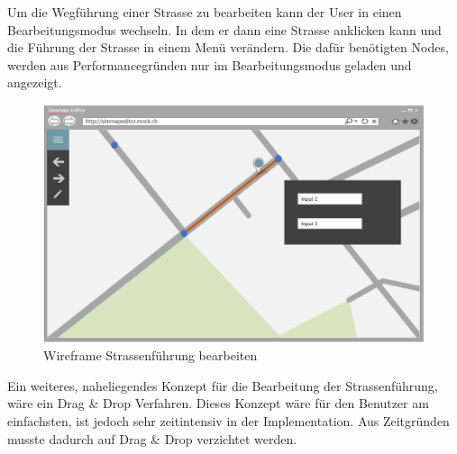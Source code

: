 \newpage
\noindent
Um die Wegführung einer Strasse zu bearbeiten kann der User in einen Bearbeitungsmodus wechseln. In dem er dann eine Strasse anklicken kann und die Führung der Strasse in einem Menü verändern. Die dafür benötigten Nodes, werden aus Performancegründen nur im Bearbeitungsmodus geladen und angezeigt.
\begin{figure}[H]
\centering
\includegraphics[height=7cm]{images/KonzeptChangeStreet.PNG}
\caption{Wireframe Strassenführung bearbeiten}
\label{fig:concepteditStreet}
\end{figure}
\noindent
Ein weiteres, naheliegendes Konzept für die Bearbeitung der Strassenführung, wäre ein Drag \& Drop Verfahren. Dieses Konzept wäre für den Benutzer am einfachsten, ist jedoch sehr zeitintensiv in der Implementation. Aus Zeitgründen musste dadurch auf Drag \& Drop verzichtet werden.

